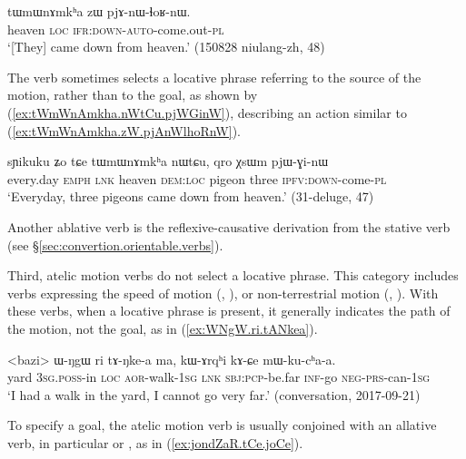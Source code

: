 \begin{exe}
\ex \label{ex:tWmWnAmkha.zW.pjAnWlhoRnW}
\gll  tɯmɯnɤmkʰa zɯ pjɤ-nɯ-ɬoʁ-nɯ. \\
heaven \textsc{loc} \textsc{ifr}:\textsc{down}-\textsc{auto}-come.out-\textsc{pl} \\
\glt `[They] came down from heaven.' (150828 niulang-zh, 48)
\end{exe}

The verb  sometimes selects a locative phrase referring to the source of the motion, rather than to the goal, as shown by (\ref{ex:tWmWnAmkha.nWtCu.pjWGinW}), describing an action similar to (\ref{ex:tWmWnAmkha.zW.pjAnWlhoRnW}).

\begin{exe}
\ex \label{ex:tWmWnAmkha.nWtCu.pjWGinW}
\gll sɲikuku ʑo tɕe tɯmɯnɤmkʰa nɯtɕu, qro χsɯm pjɯ-ɣi-nɯ \\
every.day \textsc{emph} \textsc{lnk} heaven \textsc{dem}:\textsc{loc} pigeon three \textsc{ipfv}:\textsc{down}-come-\textsc{pl} \\
\glt `Everyday, three pigeons came down from heaven.' (31-deluge, 47)
\end{exe}

Another ablative verb is the reflexive-causative  derivation from the stative verb   (see §\ref{sec:convertion.orientable.verbs}).

Third, atelic motion verbs do not select a locative phrase. This category includes verbs expressing the speed of motion (, ), or non-terrestrial motion (, ). With these verbs, when a locative phrase is present, it generally indicates the path of the motion, not the goal, as in (\ref{ex:WNgW.ri.tANkea}).

\begin{exe}
\ex \label{ex:WNgW.ri.tANkea}
\gll <bazi> ɯ-ŋgɯ ri tɤ-ŋke-a ma, kɯ-ɤrqʰi kɤ-ɕe mɯ-ku-cʰa-a. \\
yard \textsc{3sg}.\textsc{poss}-in \textsc{loc} \textsc{aor}-walk-\textsc{1sg} \textsc{lnk} \textsc{sbj}:\textsc{pcp}-be.far \textsc{inf}-go \textsc{neg}-\textsc{prs}-can-\textsc{1sg} \\
\glt `I had a walk in the yard, I cannot go very far.' (conversation, 2017-09-21)
\end{exe}

To specify a goal, the atelic motion verb is usually conjoined with an allative verb, in particular  or , as in (\ref{ex:jondZaR.tCe.joCe}).


